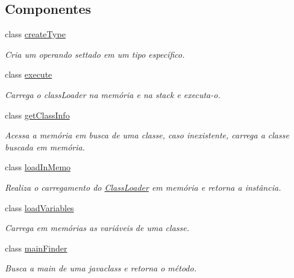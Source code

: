 \subsection*{Componentes}
\begin{DoxyCompactItemize}
\item 
class \hyperlink{class_interpreter_1_1create_type}{create\+Type}
\begin{DoxyCompactList}\small\item\em Cria um operando settado em um tipo específico. \end{DoxyCompactList}\item 
class \hyperlink{class_interpreter_1_1execute}{execute}
\begin{DoxyCompactList}\small\item\em Carrega o class\+Loader na memória e na stack e executa-\/o. \end{DoxyCompactList}\item 
class \hyperlink{class_interpreter_1_1get_class_info}{get\+Class\+Info}
\begin{DoxyCompactList}\small\item\em Acessa a memória em busca de uma classe, caso inexistente, carrega a classe buscada em memória. \end{DoxyCompactList}\item 
class \hyperlink{class_interpreter_1_1load_in_memo}{load\+In\+Memo}
\begin{DoxyCompactList}\small\item\em Realiza o carregamento do \hyperlink{class_class_loader}{Class\+Loader} em memória e retorna a instância. \end{DoxyCompactList}\item 
class \hyperlink{class_interpreter_1_1load_variables}{load\+Variables}
\begin{DoxyCompactList}\small\item\em Carrega em memórias as variáveis de uma classe. \end{DoxyCompactList}\item 
class \hyperlink{class_interpreter_1_1main_finder}{main\+Finder}
\begin{DoxyCompactList}\small\item\em Busca a main de uma javaclass e retorna o método. \end{DoxyCompactList}\end{DoxyCompactItemize}
